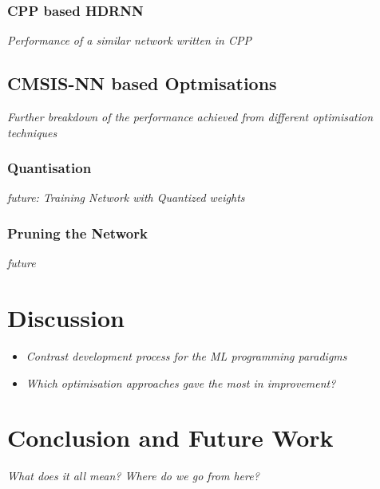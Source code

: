 \subsection[CPP - Eigen]{CPP based HDRNN}
\textit{Performance of a similar network written in CPP}

\section{CMSIS-NN based Optmisations}
\textit{Further breakdown of the performance achieved from different optimisation techniques}

\subsection{Quantisation}
\textit{future: Training Network with Quantized weights}

\subsection{Pruning the Network}
\textit{future}

\chapter{Discussion}
\begin{itemize}
	\item \textit{Contrast development process for the ML programming paradigms}
	\item \textit{Which optimisation approaches gave the most in improvement?}
\end{itemize}

\chapter{Conclusion and Future Work}
\textit{What does it all mean? Where do we go from here?}
